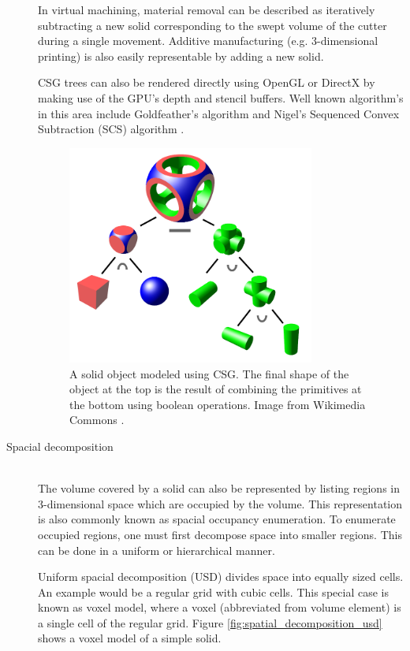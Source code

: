 \begin{description}
	In virtual machining, material removal can be described as iteratively subtracting a new solid corresponding to the swept volume of the cutter during a single movement.
	Additive manufacturing (e.g. 3-dimensional printing) is also easily representable by adding a new solid.
	
	CSG trees can also be rendered directly using OpenGL or DirectX by making use of the GPU's depth and stencil buffers.
	Well known algorithm's in this area include Goldfeather's algorithm \cite{goldfeather} and Nigel's Sequenced Convex Subtraction (SCS) algorithm \cite{scs}.
	
	\begin{figure}[H]
		\centering
		\includegraphics[width=0.8\textwidth]{images/csg_tree}
		\caption{
			A solid object modeled using CSG.
			The final shape of the object at the top is the result of combining the primitives at the bottom using boolean operations.
			Image from Wikimedia Commons \cite{csg_tree}.
		}
		\label{fig:csg_tree}
	\end{figure}
	
	\item[Spacial decomposition] \hfill \\
	The volume covered by a solid can also be represented by listing regions in 3-dimensional space which are occupied by the volume.
	This representation is also commonly known as spacial occupancy enumeration.
	To enumerate occupied regions, one must first decompose space into smaller regions.
	This can be done in a uniform or hierarchical manner.
	
	Uniform spacial decomposition (USD) divides space into equally sized cells.
	An example would be a regular grid with cubic cells.
	This special case is known as voxel model, where a voxel (abbreviated from volume element) is a single cell of the regular grid.
	Figure \ref{fig:spatial_decomposition_usd} shows a voxel model of a simple solid.
	

\end{description}
